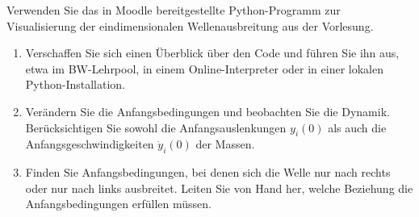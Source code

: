 \begin{ExerciseBlock}
Verwenden Sie das in Moodle bereitgestellte Python-Programm zur Visualisierung der eindimensionalen Wellenausbreitung aus der Vorlesung.
\begin{enumerate}
\item Verschaffen Sie sich einen Überblick über den Code und führen Sie ihn aus, etwa im BW-Lehrpool, in einem Online-Interpreter oder in einer lokalen Python-Installation.
\item Verändern Sie die Anfangsbedingungen und beobachten Sie die Dynamik. Berücksichtigen Sie sowohl die Anfangsauslenkungen $y_i(0)$ als auch die Anfangsgeschwindigkeiten $\dot y_i(0)$ der Massen.
\item Finden Sie Anfangsbedingungen, bei denen sich die Welle nur nach rechts oder nur nach links ausbreitet. Leiten Sie von Hand her, welche Beziehung die Anfangsbedingungen erfüllen müssen.
\end{enumerate}
\end{ExerciseBlock}
